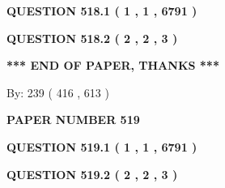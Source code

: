 \documentclass[12pt]{article}
\begin{document}
   
   
   
 \vspace{0.2in}
 
 
 
 
   
   
  
\vspace{0.2in}
  
{\textbf{\Large{QUESTION
518.1 
 ( 1 , 1 , 6791 )
}}}
  
  
  
\vspace{0.2in}
  
{\textbf{\Large{QUESTION
518.2 
 ( 2 , 2 , 3 )
}}}
  
  
   
   
 \vspace{0.2in}
 
   
   
   
   
\vspace{1.0in} 
{\textbf{\large{ *** END OF PAPER, THANKS *** }}} 
   
   
\hspace{1.0in} By: 
 239 ( 416 ,  613 )
   
   
   
   
\newpage 
\setcounter{page}{ 
   519001 } 
   
   
   
   
 {\textbf{ \Large{ PAPER NUMBER  519  }}}
   
   
\vspace{0.2in}
   
   
   
   
   
   
 \vspace{0.2in}
 
 
 
 
   
   
  
\vspace{0.2in}
  
{\textbf{\Large{QUESTION
519.1 
 ( 1 , 1 , 6791 )
}}}
  
  
  
\vspace{0.2in}
  
{\textbf{\Large{QUESTION
519.2 
 ( 2 , 2 , 3 )
}}}
  
  
   
   
 \vspace{0.2in}
 
\end{document}
